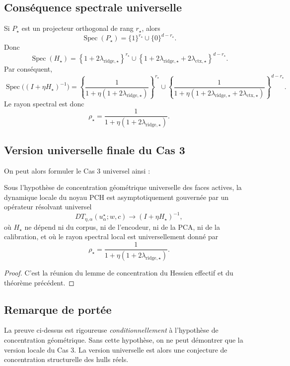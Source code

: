 \subsection{Conséquence spectrale universelle}

Si $P_\star$ est un projecteur orthogonal de rang $r_\star$, alors
\[
\operatorname{Spec}(P_\star)=\{1\}^{r_\star}\cup\{0\}^{d-r_\star}.
\]
Donc
\[
\operatorname{Spec}(H_\star)
=
\left\{
1+2\lambda_{\mathrm{ridge},\star}
\right\}^{r_\star}
\cup
\left\{
1+2\lambda_{\mathrm{ridge},\star}+2\lambda_{\mathrm{ctx},\star}
\right\}^{d-r_\star}.
\]
Par conséquent,
\[
\operatorname{Spec}\bigl((I+\eta H_\star)^{-1}\bigr)
=
\left\{
\frac{1}{1+\eta(1+2\lambda_{\mathrm{ridge},\star})}
\right\}^{r_\star}
\cup
\left\{
\frac{1}{1+\eta(1+2\lambda_{\mathrm{ridge},\star}+2\lambda_{\mathrm{ctx},\star})}
\right\}^{d-r_\star}.
\]
Le rayon spectral est donc
\[
\rho_\star
=
\frac{1}{1+\eta(1+2\lambda_{\mathrm{ridge},\star})}.
\]

\subsection{Version universelle finale du Cas 3}

On peut alors formuler le Cas 3 universel ainsi :

\begin{theorem}
Sous l'hypothèse de concentration géométrique universelle des faces actives, la dynamique locale du noyau PCH est asymptotiquement gouvernée par un opérateur résolvant universel
\[
DT_{\eta,\alpha}(u_\alpha^\star;w,c)
\to
(I+\eta H_\star)^{-1},
\]
où $H_\star$ ne dépend ni du corpus, ni de l'encodeur, ni de la PCA, ni de la calibration, et où le rayon spectral local est universellement donné par
\[
\rho_\star
=
\frac{1}{1+\eta(1+2\lambda_{\mathrm{ridge},\star})}.
\]
\end{theorem}

\begin{proof}
C'est la réunion du lemme de concentration du Hessien effectif et du théorème précédent.
\end{proof}

\subsection{Remarque de portée}

La preuve ci-dessus est rigoureuse \emph{conditionnellement} à l'hypothèse de concentration géométrique.  
Sans cette hypothèse, on ne peut démontrer que la version locale du Cas 3.  
La version universelle est alors une conjecture de concentration structurelle des hulls réels.

